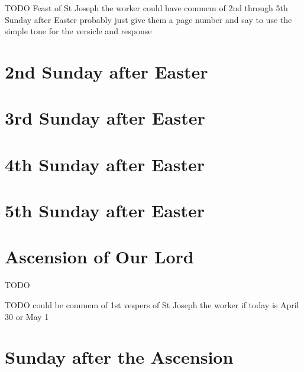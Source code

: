 {{{\def\commemorations{If the Feast of the Annunciation has been transferred to the Monday following Low Sunday, First Vespers is commemorated as on page \pageref{annunciation-commem}.  If today is April 30, May 1, or May 2, then First Vespers of St Joseph the Worker is commemorated as follows.}
\printcommemnote{}
}

{
\label{stjoseph-worker-commem}
\def\vrlinebreak{T}

\bigskip
\benedicamusdomino{}
}

{
    TODO Feast of St Joseph the worker could have commem of 2nd through 5th Sunday after Easter
    probably just give them a page number and say to use the simple tone for the versicle and response
}

\newcommand{\printhymnnote}{
    \noindent\printnote{Hymn. \emph{Ad Régias Agni Dapes}, page \pageref{hymn-adregiasagnidapes}.
    \Vbar~\emph{Mane nobíscum}, page \pageref{vr-manenobiscum}.}
}
{
\section{2nd Sunday after Easter}
\printcommonvespers{}
\benedicamusdomino{}
}
{
\section{3rd Sunday after Easter}
\printcommonvespers{}
\benedicamusdomino{}
}

{
\section{4th Sunday after Easter}
\printcommonvespers{}
\benedicamusdomino{}
}

{
\section{5th Sunday after Easter}
\printcommonvespers{}
\benedicamusdomino{}
}

{
\section{Ascension of Our Lord}
\subtitle{1st Class}
TODO

TODO could be commem of 1st vespers of St Joseph the worker if today is April 30 or May 1

}

{
\section{Sunday after the Ascension}
\printcommonvespers{}
\def\printfullhymn{
    {
        \printhymn{\oldstylenums{\hymnlinetwo}}{\hymninitial}{\hymntex}{\hymntranslation}
        \def\vrlinebreak{T}
        \printvr[\greblockcustos]{\vrtex}{\vtranslation}{\rtranslation}
    }
}
\benedicamusdomino{}
}
}
}